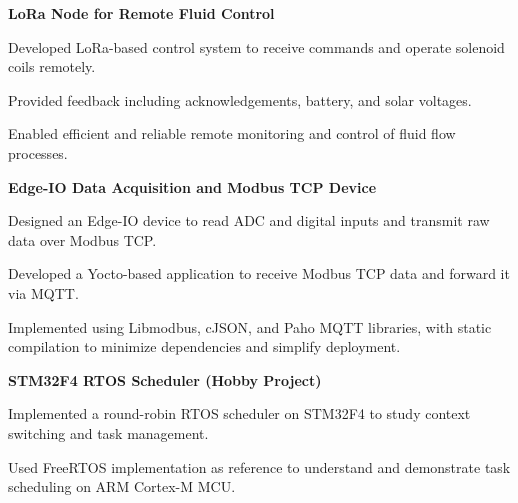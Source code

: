 \begin{cventries}
\cventry
    {\textbf{LoRa Node for Remote Fluid Control}} 
    {} 
    {} 
    {} 
    {
      \begin{cvitems}
        \item {Developed LoRa-based control system to receive commands and operate solenoid coils remotely.}
        \item {Provided feedback including acknowledgements, battery, and solar voltages.}
        \item {Enabled efficient and reliable remote monitoring and control of fluid flow processes.}
      \end{cvitems}
    }

  \cventry
    {\textbf{Edge-IO Data Acquisition and Modbus TCP Device}} 
    {} 
    {} 
    {} 
    {
      \begin{cvitems}
        \item {Designed an Edge-IO device to read ADC and digital inputs and transmit raw data over Modbus TCP.}
        \item {Developed a Yocto-based application to receive Modbus TCP data and forward it via MQTT.}
        \item {Implemented using Libmodbus, cJSON, and Paho MQTT libraries, with static compilation to minimize dependencies and simplify deployment.}
      \end{cvitems}
    }

\cventry
    {\textbf{STM32F4 RTOS Scheduler (Hobby Project)}} 
    {} 
    {} 
    {} 
    {
      \begin{cvitems}
        \item {Implemented a round-robin RTOS scheduler on STM32F4 to study context switching and task management.}
        \item {Used FreeRTOS implementation as reference to understand and demonstrate task scheduling on ARM Cortex-M MCU.}
      \end{cvitems}
    }

\end{cventries}
